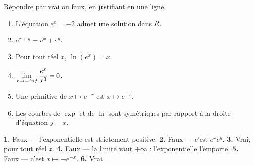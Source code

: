 \begin{jemeteste}
Répondre par vrai ou faux, en justifiant en une ligne.

\begin{enumerate}[label=\textbf{\arabic*.}, leftmargin=*, itemsep=0.28em]
  \item L'équation $e^{x} = -2$ admet une solution dans $R$.
  \item $e^{x+y} = e^{x} + e^{y}$.
  \item Pour tout réel $x$, $\ln\left(e^{x}\right) = x$.
  \item $\limpinf \dfrac{e^{x}}{x^{3}} = 0$.
  \item Une primitive de $x \mapsto e^{-x}$ est $x \mapsto e^{-x}$.
  \item Les courbes de $\exp$ et de $\ln$ sont symétriques par rapport à la
        droite d'équation $y = x$.
\end{enumerate}
\end{jemeteste}

\begin{corrige}[je me teste]
\textbf{1.} Faux — l'exponentielle est strictement positive.
\textbf{2.} Faux — c'est $e^{x}e^{y}$.
\textbf{3.} Vrai, pour tout réel $x$.
\textbf{4.} Faux — la limite vaut $+\infty$ : l'exponentielle l'emporte.
\textbf{5.} Faux — c'est $x \mapsto -e^{-x}$.
\textbf{6.} Vrai.
\end{corrige}

